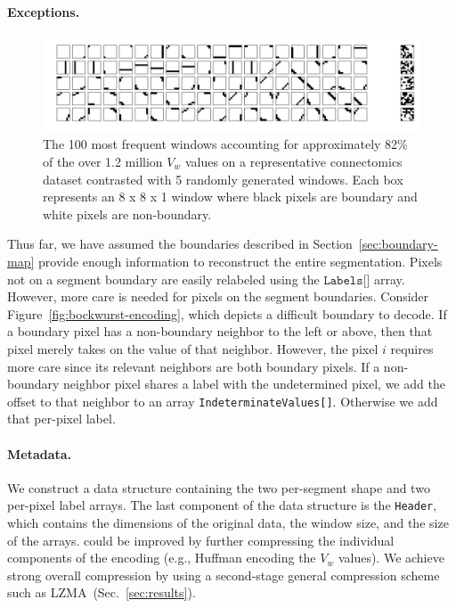 \paragraph{Exceptions.}

\begin{figure}
  \begin{center}
    \begin{minipage}{.8\linewidth}
      \includegraphics[width=\linewidth]{./gfx/window_values.pdf}
    \end{minipage}
  \end{center}
  \caption{The 100 most frequent windows accounting for approximately 82\% of the over 1.2 million $V_w$ values on a representative connectomics dataset contrasted with 5 randomly generated windows. Each box represents an 8 x 8 x 1 window where black pixels are boundary and white pixels are non-boundary.}
  \label{fig:bockwurst-frequency}
\end{figure}

Thus far, we have assumed the boundaries described in Section~\ref{sec:boundary-map} provide enough information to reconstruct the entire segmentation.
Pixels not on a segment boundary are easily relabeled using the $\texttt{Labels[]}$ array. 
However, more care is needed for pixels on the segment boundaries. 
Consider Figure~\ref{fig:bockwurst-encoding}, which depicts a difficult boundary to decode. 
If a boundary pixel has a non-boundary neighbor to the left or above, then that pixel merely takes on the value of that neighbor. 
However, the pixel $i$ requires more care since its relevant neighbors are both boundary pixels. 
If a non-boundary neighbor pixel shares a label with the undetermined pixel, we add the offset to that neighbor to an array \texttt{IndeterminateValues[]}. 
Otherwise we add that per-pixel label.
\paragraph{Metadata.}

We construct a data structure containing the two per-segment shape and two per-pixel label arrays. The last component of the data structure is the \texttt{Header}, which contains the dimensions of the original data, the window size, and the size of the arrays. \appName could be improved by further compressing the individual components of the encoding (e.g., Huffman encoding the $V_w$ values). We achieve strong overall compression by using a second-stage general compression scheme such as LZMA~(Sec.~\ref{sec:results}).


